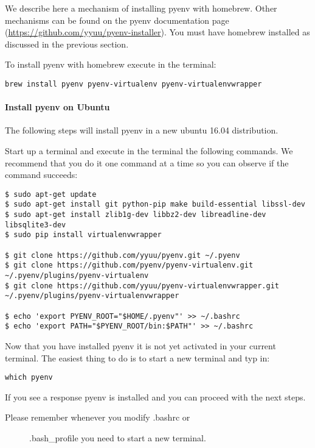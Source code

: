 We describe here a mechanism of installing pyenv with homebrew. Other
mechanisms can be found on the pyenv documentation page
(\url{https://github.com/yyuu/pyenv-installer}). You must have homebrew
installed as discussed in the previous section.

To install pyenv with homebrew execute in the terminal:

\begin{verbatim}
brew install pyenv pyenv-virtualenv pyenv-virtualenvwrapper
\end{verbatim}

\paragraph{Install pyenv on Ubuntu}\label{install-pyenv-on-ubuntu}

The following steps will install pyenv in a new ubuntu 16.04
distribution.

Start up a terminal and execute in the terminal the following commands.
We recommend that you do it one command at a time so you can observe if
the command succeeds:

\begin{verbatim}
$ sudo apt-get update
$ sudo apt-get install git python-pip make build-essential libssl-dev
$ sudo apt-get install zlib1g-dev libbz2-dev libreadline-dev libsqlite3-dev
$ sudo pip install virtualenvwrapper

$ git clone https://github.com/yyuu/pyenv.git ~/.pyenv
$ git clone https://github.com/pyenv/pyenv-virtualenv.git ~/.pyenv/plugins/pyenv-virtualenv   
$ git clone https://github.com/yyuu/pyenv-virtualenvwrapper.git ~/.pyenv/plugins/pyenv-virtualenvwrapper

$ echo 'export PYENV_ROOT="$HOME/.pyenv"' >> ~/.bashrc
$ echo 'export PATH="$PYENV_ROOT/bin:$PATH"' >> ~/.bashrc
\end{verbatim}

Now that you have installed pyenv it is not yet activated in your
current terminal. The easiest thing to do is to start a new terminal and
typ in:

\begin{verbatim}
which pyenv
\end{verbatim}

If you see a response pyenv is installed and you can proceed with the
next steps.

\begin{description}
\item[Please remember whenever you modify .bashrc or]
.bash\_profile you need to start a new terminal.
\end{description}

